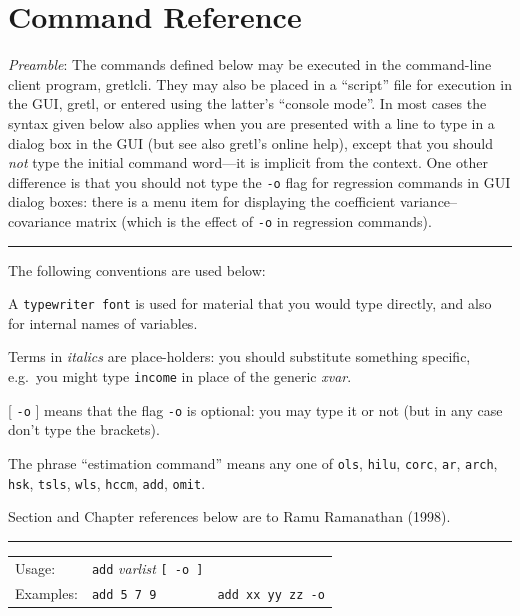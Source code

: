 \documentclass{article}
\begin{document}
{
\setlength{\parindent}{0pt}
\setlength{\parskip}{4pt}

\section{Command Reference}
\label{cmdref}

\textit{Preamble}: The commands defined below may be executed in the
command-line client program, \textsf{gretlcli}.  They may also be
placed in a ``script'' file for execution in the GUI, \textsf{gretl},
or entered using the latter's ``console mode''.  In most cases the
syntax given below also applies when you are presented with a line to
type in a dialog box in the GUI (but see also \textsf{gretl}'s online
help), except that you should \textit{not} type the initial command
word---it is implicit from the context.  One other difference is that
you should not type the \texttt{-o} flag for regression commands in
GUI dialog boxes: there is a menu item for displaying the coefficient
variance--covariance matrix (which is the effect of \texttt{-o} in
regression commands).

\rule{\columnwidth}{1pt}

The following conventions are used below:

\textbullet{} A \texttt{typewriter font} is used for material that you
would type directly, and also for internal names of variables.

\textbullet{} Terms in \textit{italics} are place-holders: you should
substitute something specific, e.g.\ you might type \texttt{income} in
place of the generic \textit{xvar}.

\textbullet{} [ \texttt{-o} ] means that the flag \texttt{-o} is
optional: you may type it or not (but in any case don't type the
brackets).

\textbullet{} The phrase ``estimation command'' means any one
of \texttt{ols}, \texttt{hilu}, \texttt{corc}, \texttt{ar},
\texttt{arch}, \texttt{hsk}, \texttt{tsls}, \texttt{wls},
\texttt{hccm}, \texttt{add}, \texttt{omit}.

Section and Chapter references below are to Ramu Ramanathan (1998).

\rule{\columnwidth}{1pt}
\vspace{4pt}


\begin{tabular}{lll}
Usage:   &       \texttt{add} \textit{varlist} \texttt{[ -o ]}\\
Examples:   &    \texttt{add 5 7 9} &  \texttt{add xx yy zz -o}
\end{tabular}

}
\end{document}
